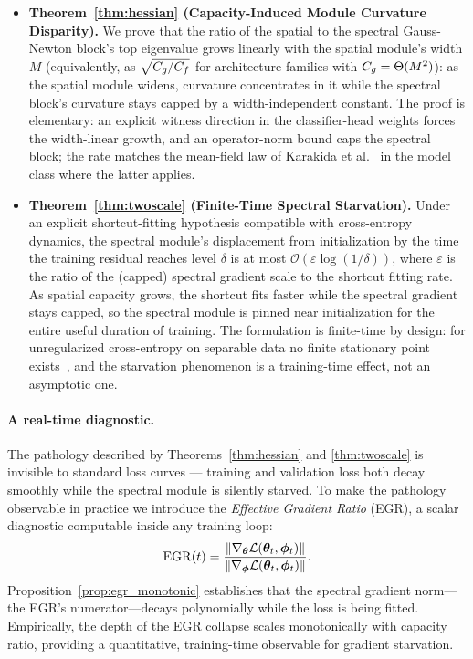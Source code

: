 \begin{itemize}
    \item \textbf{Theorem~\ref{thm:hessian} (Capacity-Induced Module
          Curvature Disparity).} We prove that the ratio of the
          spatial to the spectral Gauss-Newton block's top eigenvalue
          grows linearly with the spatial module's width $M$
          (equivalently, as $\sqrt{C_g/C_f}$ for architecture
          families with $C_g = \Theta(M^2)$): as the spatial module
          widens, curvature concentrates in it while the spectral
          block's curvature stays capped by a width-independent
          constant. The proof is elementary: an explicit witness
          direction in the classifier-head weights forces the
          width-linear growth, and an operator-norm bound caps the
          spectral block; the rate matches the mean-field law of
          Karakida et al.~\cite{karakida2019universal} in the model
          class where the latter applies.
    \item \textbf{Theorem~\ref{thm:twoscale} (Finite-Time Spectral
          Starvation).} Under an explicit shortcut-fitting hypothesis
          compatible with cross-entropy dynamics, the spectral
          module's displacement from initialization by the time the
          training residual reaches level $\delta$ is at most
          $\mathcal{O}(\varepsilon \log(1/\delta))$, where
          $\varepsilon$ is the ratio of the (capped) spectral gradient
          scale to the shortcut fitting rate. As spatial capacity
          grows, the shortcut fits faster while the spectral gradient
          stays capped, so the spectral module is pinned near
          initialization for the entire useful duration of training.
          The formulation is finite-time by design: for unregularized
          cross-entropy on separable data no finite stationary point
          exists~\cite{soudry2018implicit}, and the starvation
          phenomenon is a training-time effect, not an asymptotic
          one.
\end{itemize}

\paragraph{A real-time diagnostic.}
The pathology described by Theorems~\ref{thm:hessian} and
\ref{thm:twoscale} is invisible to standard loss curves --- training
and validation loss both decay smoothly while the spectral module is
silently starved. To make the pathology observable in practice we
introduce the \emph{Effective Gradient Ratio} (EGR), a scalar
diagnostic computable inside any training loop:
\[
    \mathrm{EGR}(t) = \frac{\left\lVert\nabla_{\boldsymbol{\theta}} \mathcal{L}({\boldsymbol{\theta}}_t, {\boldsymbol{\phi}}_t)\right\rVert}
                   {\left\lVert\nabla_{\boldsymbol{\phi}} \mathcal{L}({\boldsymbol{\theta}}_t, {\boldsymbol{\phi}}_t)\right\rVert}.
\]
Proposition~\ref{prop:egr_monotonic} establishes that the spectral
gradient norm---the EGR's numerator---decays polynomially while the
loss is being fitted. Empirically, the depth of the EGR collapse
scales monotonically with capacity ratio, providing a quantitative,
training-time observable for gradient starvation.

